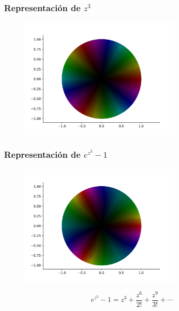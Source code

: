 \documentclass[spanish, a4paper, 12pt, final, slideColor, nototal, colorBG, pdf, noaccumulate, darkblue]{beamer}
\begin{document}
\begin{frame}
    \frametitle{Representación de $z^3$}
    \begin{figure}[!htbp]
        \centering
        \includegraphics[width=0.7\textwidth]{../Aplicacion/z^3(2).png}
        \label{fig:z^3(2)}
    \end{figure}
\end{frame}

\begin{frame}
    \frametitle{Representación de $e^{z^3}-1$}
    \begin{figure}[!htbp]
        \centering
        \includegraphics[width=0.7\textwidth]{../Aplicacion/e^(z^3)-1.png}
        \label{fig:e^(z^3)-1}
    \end{figure}
    \begin{equation*}
        e^{z^3} - 1 = z^3 + \frac{z^6}{2!} + \frac{z^9}{3!} + \cdots
    \end{equation*}
\end{frame}
\end{document}
